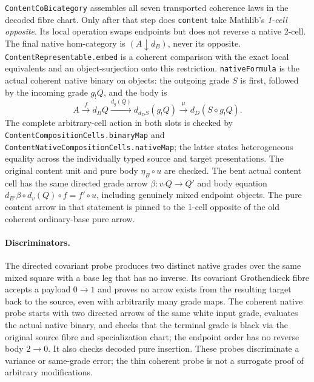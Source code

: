 \documentclass[11pt]{article}
\newcommand{\m}[1]{\texttt{#1}}
\begin{document}
\m{ContentCoBicategory} assembles all seven transported coherence laws in
the decoded fibre chart. Only after that step does \m{content} take
Mathlib's \emph{1-cell opposite}. Its local operation swaps endpoints but
does not reverse a native 2-cell. The final native hom-category is
$(A\downarrow d_B)$, never its opposite. \m{ContentRepresentable.embed}
is a coherent comparison with the exact local equivalents and an
object-surjection onto this restriction. \m{nativeFormula} is the actual
coherent native binary on objects: the outgoing grade $S$ is first,
followed by the incoming grade $g_!Q$, and the body is
\[
 A\xrightarrow{f}d_BQ\xrightarrow{d_g(Q)}d_{d_DS}(g_!Q)
  \xrightarrow{\mu}d_D(S\diamond g_!Q).
\]
The complete arbitrary-cell action in both slots is checked by
\m{ContentCompositionCells.binaryMap} and
\m{ContentNativeCompositionCells.nativeMap}; the latter states heterogeneous
equality across the individually typed source and target presentations.
The original content unit and pure body $\eta_B\circ u$ are checked.
The bent actual content cell has the same directed grade arrow
$\beta:v_!Q\to Q'$ and body equation
$d_{B'}\beta\circ d_v(Q)\circ f=f'\circ u$, including genuinely
mixed endpoint objects. The pure content arrow in that statement is pinned
to the 1-cell opposite of the old coherent ordinary-base pure arrow.

\paragraph{Discriminators.}
The directed covariant probe produces two distinct native grades over the
same mixed square with a base leg that has no inverse. Its covariant
Grothendieck fibre accepts a payload $0\to1$ and proves no arrow exists
from the resulting target back to the source, even with arbitrarily many
grade maps. The coherent native probe starts with two directed arrows of
the same white input grade, evaluates the actual native binary,
and checks that the terminal grade is black via the original source
fibre and specialization chart; the endpoint order has no reverse
body $2\to0$. It also checks decoded pure insertion. These probes
discriminate a variance or same-grade error; the thin coherent probe is
not a surrogate proof of arbitrary modifications.
\end{document}
